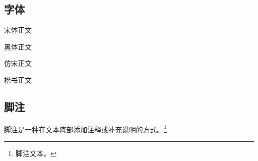 \subsection{字体}

{\songti 宋体正文}

{\heiti 黑体正文}

{\fangsong 仿宋正文}

{\kaishu 楷书正文}

\subsection{脚注}

脚注是一种在文本底部添加注释或补充说明的方式。\footnote{脚注文本。}